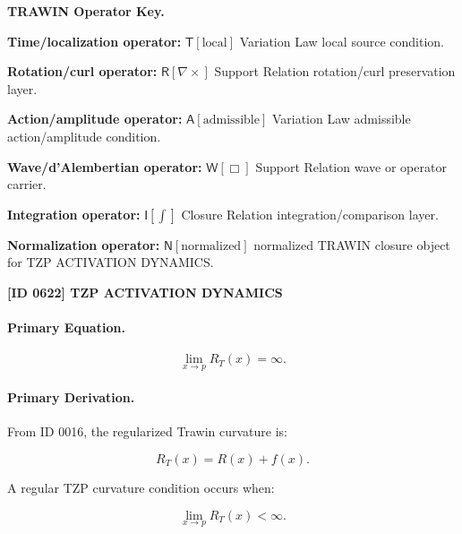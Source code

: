 \par\vspace{0.45\baselineskip}
\noindent\begin{minipage}[t]{\linewidth}
\begingroup
\small
\raggedright
\textbf{TRAWIN Operator Key.}\par
\noindent\textbf{Time/localization operator:} $\mathsf{T}\!\left[\mathrm{local}\right]$ Variation Law local source condition.\par
\noindent\textbf{Rotation/curl operator:} $\mathsf{R}\!\left[\nabla\times\right]$ Support Relation rotation/curl preservation layer.\par
\noindent\textbf{Action/amplitude operator:} $\mathsf{A}\!\left[\mathrm{admissible}\right]$ Variation Law admissible action/amplitude condition.\par
\noindent\textbf{Wave/d'Alembertian operator:} $\mathsf{W}\!\left[\Box\right]$ Support Relation wave or operator carrier.\par
\noindent\textbf{Integration operator:} $\mathsf{I}\!\left[\int\right]$ Closure Relation integration/comparison layer.\par
\noindent\textbf{Normalization operator:} $\mathsf{N}\!\left[\mathrm{normalized}\right]$ normalized TRAWIN closure object for TZP ACTIVATION DYNAMICS.\par
\endgroup
\end{minipage}

\clearpage
\noindent\textbf{[ID 0622] TZP ACTIVATION DYNAMICS}\par
\vspace{0.35em}
\paragraph{Primary Equation.}
\begin{equation}
\lim_{x\to p}R_T(x)=\infty .
\end{equation}

\paragraph{Primary Derivation.}
From ID 0016, the regularized Trawin curvature is:

\begin{equation}
R_T(x)=R(x)+f(x).
\end{equation}

A regular TZP curvature condition occurs when:

\begin{equation}
\lim_{x\to p}R_T(x)<\infty .
\end{equation}

